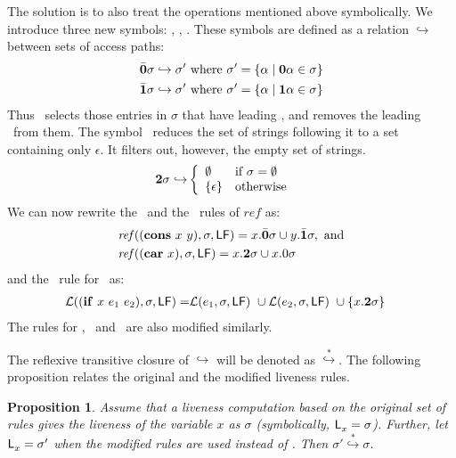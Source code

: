 \documentclass[preprint, 9pt]{sigplanconf}
\newcommand{\warning}[1]{{\color{Myred}{#1}}}
\newtheorem{proposition}[theorem]{Proposition}
\begin{document}
The solution is to  also treat the operations mentioned
above  symbolically.  We  introduce three  new symbols:
\bcar, \bcdr,  \clazy.  These symbols are  defined as a
relation  $\hookrightarrow$  between   sets  of  access
paths:
\begin{align*}
  &\bar{\mathbf{0}}\sigma \hookrightarrow \sigma' \mbox{ where } \sigma' = \{\alpha \mid \mathbf{0}\alpha \in \sigma\}\\
  &\bar{\mathbf{1}}\sigma \hookrightarrow \sigma' \mbox{ where } \sigma' = \{\alpha \mid \mathbf{1}\alpha \in \sigma\}
\end{align*}
Thus \bcar\ selects those entries in $\sigma$ that have leading \acar, and removes the leading \acar\ from them.
The symbol \clazy\ reduces the set of strings following it to a set containing only $\epsilon$. It filters out, however, the empty set of strings.
\begin{align*}
  {\mathbf{2}}\sigma \hookrightarrow & \left\{ 
  \begin{array}{ll}
    \emptyset&\mbox{if}~\sigma = \emptyset\\
    \{\epsilon\} & \mbox{otherwise}
  \end{array}\right.
\end{align*}
We can  now rewrite the \CONS\  and the \CAR\  rules of $\mathit{ref}$
as:
\begin{align*}
&\mathit{ref\/}((\mbox{$\mathbf{cons}$}~x~y),\sigma,\mathsf{LF})
= x.\bar{\mathbf{0}}\sigma \cup y.\bar{\mathbf{1}}\sigma  \label{eqn:mod-cons},~
\mbox{and} \\
&\mathit{ref\/}((\mbox{$\mathbf{car}$}~x),\sigma,\mathsf{LF})
          =   x.{\mathbf{2}}\sigma \cup x.0\sigma
\end{align*}
and the \Lfunonly\ rule
for \SIF\ as:
\begin{align*}
\mathcal{L}((\mbox{$\mathbf{ if}$}~x~e_1~e_2),\sigma,\mathsf{LF}) =
                    &\mathcal{L}(e_1,\sigma,\mathsf{LF})~\cup
        \mathcal{L}(e_2,\sigma,\mathsf{LF})~\cup
          \{x.{\mathbf{2}} \sigma\}
\end{align*}
The rules for  \CDR, \PRIM\ and \NULLQ\ are also
modified similarly.


\warning{When   there  are   multiple   occurrences  of   \bcar,
\bcdr\  and \clazy,  $\hookrightarrow$ is  applied from
right  to left.}   The reflexive  transitive closure  of
$\hookrightarrow$      will      be     denoted      as
$\stackrel{*}{\hookrightarrow}$.      The     following
proposition  relates  the  original  and  the  modified
liveness rules. 
\begin{proposition}
Assume  that  a  liveness   computation  based  on  the
original  set  of  rules  gives  the  liveness  of  the
variable  $x$   as $\sigma$
(symbolically,  $\mathsf{L}_{{x}}^{}=  \sigma$).  Further,  let
$\mathsf{L}_{{x}}^{}= \sigma'$ when the modified rules are used
instead      of      \Lfunonly.      Then      $\sigma'
\stackrel{*}{\hookrightarrow} \sigma$.
\end{proposition}
\end{document}
